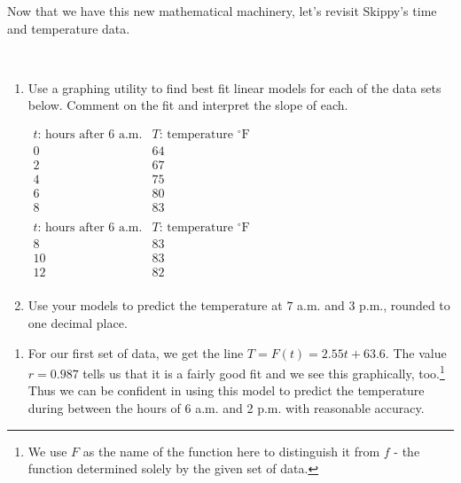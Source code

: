 \documentclass{ximera}
\begin{document}
Now that we have this new mathematical machinery, let's revisit Skippy's time and temperature data.
  
\begin{example} \label{timetempregressionex}  $~$
  
\begin{enumerate}
  
\item Use a graphing utility to find best fit linear models for each of the data sets below. Comment on the fit and interpret the slope of each.

\begin{center}
  

  
$\begin{array}{|c||c|}  \hline

 \text{$t$: hours after 6 a.m.}  & \text{$T$: temperature $^{\circ}$F} \\ \hline
 0 & 64  \\
 2 & 67  \\
 4 &  75  \\
 6 &  80 \\
 8 & 83  \\

\end{array}$\quad\quad
$\begin{array}{|c||c|}  \hline

 \text{$t$: hours after 6 a.m.}  & \text{$T$: temperature $^{\circ}$F} \\ \hline

 8 & 83  \\
 10 &  83 \\
 12 & 82  \\

\end{array}$ 
  

  
\end{center}

\item  Use your models to predict the temperature at $7$ a.m. and $3$ p.m., rounded to one decimal place.
  
\end{enumerate}

\begin{explanation}
  
\begin{enumerate}
  
 \item For our first set of data, we get the line $T = F(t) = 2.55t + 63.6$.  The value $r = 0.987$ tells us that it is a fairly good fit and we see this graphically, too.\footnote{We use $F$ as the name of the function here to distinguish it from $f$ - the function determined solely by the given set of data.}   Thus we can be confident in using this model to predict the temperature during between the hours of 6 a.m. and 2 p.m. with reasonable accuracy.   




\end{enumerate}
\end{explanation}
\end{example}
\end{document}
